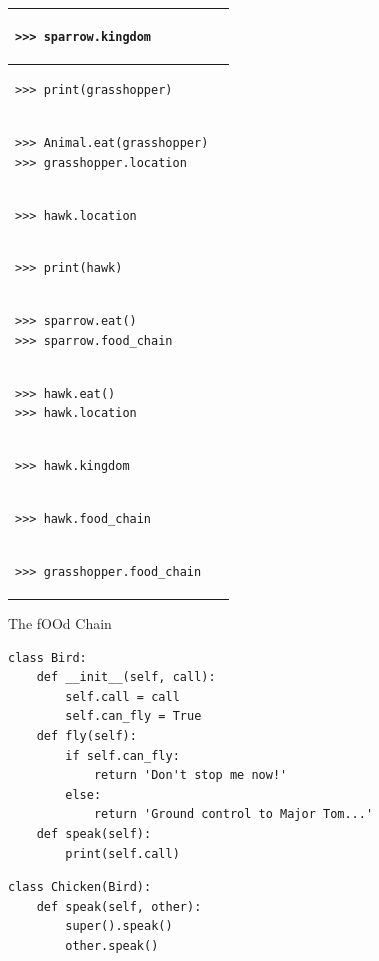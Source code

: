 \documentclass{exam}
\begin{document}
\begin{questions}
\begin{center}
\begin{tabular}{ |p{8cm}|p{6cm}| } 
 \hline
 \begin{lstlisting}
>>> sparrow.kingdom 
\end{lstlisting} &  \\  \hline
 \begin{lstlisting}
>>> print(grasshopper)
\end{lstlisting} &  \\  \hline
 \begin{lstlisting}
>>> Animal.eat(grasshopper)
>>> grasshopper.location
\end{lstlisting} &  \\  \hline
 \begin{lstlisting}
>>> hawk.location
\end{lstlisting} &  \\  \hline
 \begin{lstlisting}
>>> print(hawk)
\end{lstlisting} &  \\  \hline
 \begin{lstlisting}
>>> sparrow.eat()
>>> sparrow.food_chain
\end{lstlisting} &  \\  \hline
 \begin{lstlisting}
>>> hawk.eat()
>>> hawk.location
\end{lstlisting} &  \\  \hline
 \begin{lstlisting}
>>> hawk.kingdom
\end{lstlisting} &  \\  \hline
 \begin{lstlisting}
>>> hawk.food_chain
\end{lstlisting} &  \\  \hline
 \begin{lstlisting}
>>> grasshopper.food_chain
\end{lstlisting} &  \\  \hline
\end{tabular}
\end{center}

\clearpage

\item The fOOd Chain
\begin{lstlisting}
class Bird:
    def __init__(self, call):
        self.call = call
        self.can_fly = True
    def fly(self):
        if self.can_fly:
            return 'Don't stop me now!'
        else:
            return 'Ground control to Major Tom...'
    def speak(self):
        print(self.call)  
\end{lstlisting}
\begin{lstlisting}
class Chicken(Bird):
    def speak(self, other):
        super().speak()
        other.speak()


\end{lstlisting}
\end{questions}
\end{document}
